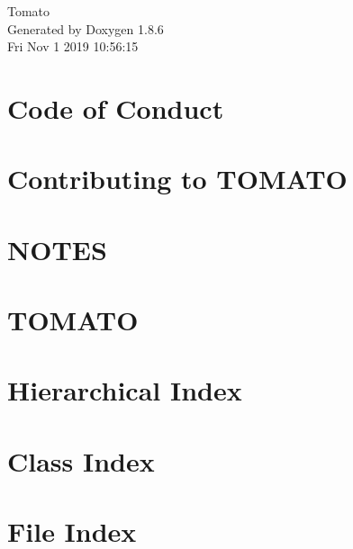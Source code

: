 \documentclass[twoside]{book}
\newcommand{\clearemptydoublepage}{%
  \newpage{\pagestyle{empty}\cleardoublepage}%
}
\begin{document}
\hypersetup{pageanchor=false}
\begin{titlepage}
\vspace*{7cm}
\begin{center}%
{\Large Tomato }\\
\vspace*{1cm}
{\large Generated by Doxygen 1.8.6}\\
\vspace*{0.5cm}
{\small Fri Nov 1 2019 10:56:15}\\
\end{center}
\end{titlepage}
\clearemptydoublepage
\tableofcontents
\clearemptydoublepage
{}
\hypersetup{pageanchor=true}

\chapter{Code of Conduct}
\label{md_codeofconduct}
\hypertarget{md_codeofconduct}{}

\chapter{Contributing to T\-O\-M\-A\-T\-O}
\label{md_contributing}
\hypertarget{md_contributing}{}

\chapter{N\-O\-T\-E\-S}
\label{md_notepad}
\hypertarget{md_notepad}{}

\chapter{T\-O\-M\-A\-T\-O}
\label{md__r_e_a_d_m_e}
\hypertarget{md__r_e_a_d_m_e}{}

\chapter{Hierarchical Index}

\chapter{Class Index}

\chapter{File Index}

\end{document}
